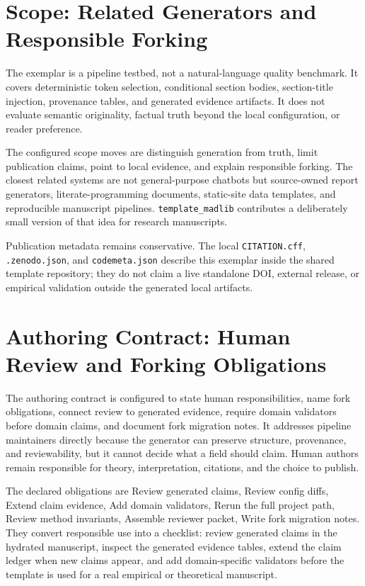\documentclass[
  english,
]{article}
\begin{document}
\newpage

\section{Scope: Related Generators and Responsible
Forking}\label{scope-related-generators-and-responsible-forking}

The exemplar is a pipeline testbed, not a natural-language quality
benchmark. It covers deterministic token selection, conditional section
bodies, section-title injection, provenance tables, and generated
evidence artifacts. It does not evaluate semantic originality, factual
truth beyond the local configuration, or reader preference.

The configured scope moves are distinguish generation from truth, limit
publication claims, point to local evidence, and explain responsible
forking. The closest related systems are not general-purpose chatbots
but source-owned report generators, literate-programming documents,
static-site data templates, and reproducible manuscript pipelines.
\texttt{template\_madlib} contributes a deliberately small version of
that idea for research manuscripts.

Publication metadata remains conservative. The local
\texttt{CITATION.cff}, \texttt{.zenodo.json}, and \texttt{codemeta.json}
describe this exemplar inside the shared template repository; they do
not claim a live standalone DOI, external release, or empirical
validation outside the generated local artifacts.

\newpage

\section{Authoring Contract: Human Review and Forking
Obligations}\label{authoring-contract-human-review-and-forking-obligations}

The authoring contract is configured to state human responsibilities,
name fork obligations, connect review to generated evidence, require
domain validators before domain claims, and document fork migration
notes. It addresses pipeline maintainers directly because the generator
can preserve structure, provenance, and reviewability, but it cannot
decide what a field should claim. Human authors remain responsible for
theory, interpretation, citations, and the choice to publish.

The declared obligations are Review generated claims, Review config
diffs, Extend claim evidence, Add domain validators, Rerun the full
project path, Review method invariants, Assemble reviewer packet, Write
fork migration notes. They convert responsible use into a checklist:
review generated claims in the hydrated manuscript, inspect the
generated evidence tables, extend the claim ledger when new claims
appear, and add domain-specific validators before the template is used
for a real empirical or theoretical manuscript.
\end{document}
